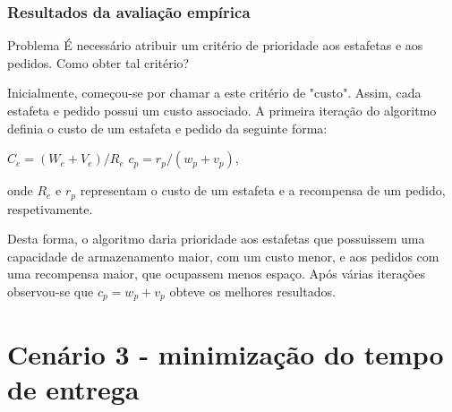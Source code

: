 \documentclass{beamer}
\begin{document}
\begin{frame}
\frametitle{Resultados da avaliação empírica}
\begin{alertblock}{Problema}
É necessário atribuir um critério de prioridade aos estafetas e aos pedidos. Como obter tal critério?
\end{alertblock}

Inicialmente, começou-se por chamar a este critério de "custo". Assim, cada estafeta e pedido 
possui um custo associado.
A primeira iteração do algoritmo definia o custo de um estafeta e pedido da seguinte forma:\\
\centerline{$C_{e} = (W_{e} + V_{e})/R_{e}$   \hspace{1cm}   $c_{p} = r_{p}/(w_{p} + v_{p})$,}

onde $R_{e}$ e $r_{p}$ representam o custo de um estafeta e a recompensa de um pedido, respetivamente.

Desta forma, o algoritmo daria prioridade aos estafetas que possuissem uma capacidade de armazenamento maior, com um custo menor, e aos pedidos com uma recompensa maior, que ocupassem menos espaço.
Após várias iterações observou-se que $c_{p} = w_{p} + v_{p}$ obteve os melhores resultados.
\end{frame}








\section{Cenário 3 - minimização do tempo de entrega}
\end{document}

